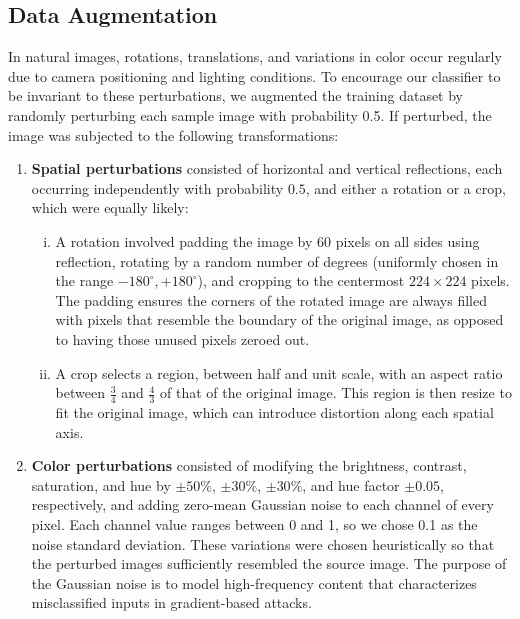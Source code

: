 \documentclass[justified]{article}
\begin{document}
  \subsection{Data Augmentation}

  In natural images, rotations, translations, and variations in color occur regularly due to camera positioning and lighting conditions.
  To encourage our classifier to be invariant to these perturbations, we augmented the training dataset by randomly perturbing each sample image with probability 0.5. If perturbed, the image was subjected to the following transformations:
  \begin{enumerate}
  \item
    \textbf{Spatial perturbations} consisted of horizontal and vertical reflections, each occurring independently with probability $0.5$, and either a rotation or a crop, which were equally likely:
    \begin{enumerate}[(i)]
    \item
      A rotation involved padding the image by 60 pixels on all sides using reflection, rotating by a random number of degrees (uniformly chosen in the range $-180^\circ, +180^\circ$), and cropping to the centermost $224 \times 224$ pixels.
      The padding ensures the corners of the rotated image are always filled with pixels that resemble the boundary of the original image, as opposed to having those unused pixels zeroed out.

    \item
      A crop selects a region, between half and unit scale, with an aspect ratio between $\frac{3}{4}$ and $\frac{4}{3}$ of that of the original image.
      This region is then resize to fit the original image, which can introduce distortion along each spatial axis.
    \end{enumerate}

  \item
    \textbf{Color perturbations} consisted of modifying the brightness, contrast, saturation, and hue by $\pm 50\%$, $\pm 30\%$, $\pm 30\%$, and hue factor $\pm 0.05$, respectively, and adding zero-mean Gaussian noise to each channel of every pixel.
    Each channel value ranges between 0 and 1, so we chose 0.1 as the noise standard deviation.
    These variations were chosen heuristically so that the perturbed images sufficiently resembled the source image.
    The purpose of the Gaussian noise is to model high-frequency content that characterizes misclassified inputs in gradient-based attacks.
  \end{enumerate}
\end{document}
